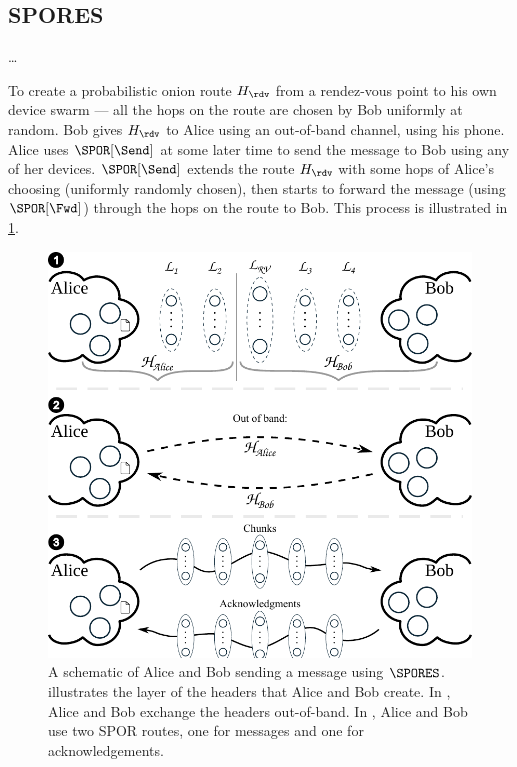 \subsection{\Acf*{SPORES}}

\dots

To create a probabilistic onion route \(H_\rdv\) from a rendez-vous point to 
his own device swarm --- all the hops on the route are chosen by Bob uniformly 
at random.
Bob gives \(H_\rdv\) to Alice using an out-of-band channel, \eg using his phone.
Alice uses \(\SPOR[\Send]\) at some later time to send the message to Bob using 
any of her devices.
\(\SPOR[\Send]\) extends the route \(H_\rdv\) with some hops of Alice's 
choosing (uniformly randomly chosen), then starts to forward the message (using 
\(\SPOR[\Fwd]\)) through the hops on the route to Bob.
This process is illustrated in \cref{fig:file-exchange}.

\begin{figure}
  \includegraphics[width=\linewidth]{figures/file_exchange_v2.pdf}
  \caption{\label{fig:file-exchange}%
    A schematic of Alice and Bob sending a message using \(\SPORES\).
     illustrates the layer of the headers that Alice and Bob create.
    In , Alice and Bob exchange the headers out-of-band.
    In , Alice and Bob use two \ac{SPOR} routes, one for messages and 
    one for acknowledgements.
  }
\end{figure}

